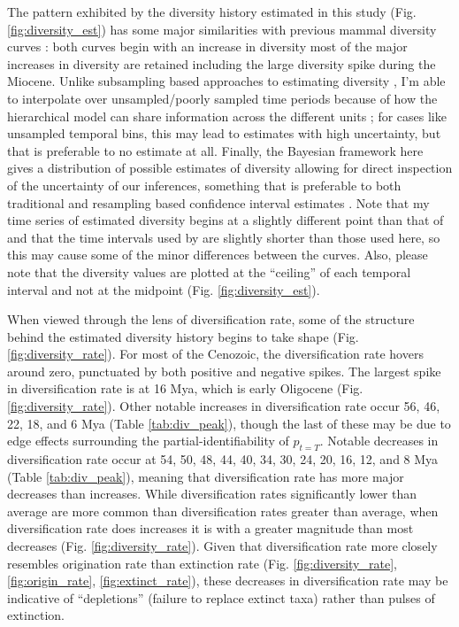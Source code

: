 \documentclass[12pt,letterpaper]{article}
\begin{document}
The pattern exhibited by the diversity history estimated in this study (Fig. \ref{fig:diversity_est}) has some major similarities with previous mammal diversity curves \citep{Alroy2009}: both curves begin with an increase in diversity most of the major increases in diversity are retained including the large diversity spike during the Miocene. Unlike subsampling based approaches to estimating diversity \citep{Alroy2010c}, I'm able to interpolate over unsampled/poorly sampled time periods because of how the hierarchical model can share information across the different units \cite{Gelman2013d}; for cases like unsampled temporal bins, this may lead to estimates with high uncertainty, but that is preferable to no estimate at all. Finally, the Bayesian framework here gives a distribution of possible estimates of diversity allowing for direct inspection of the uncertainty of our inferences, something that is preferable to both traditional and resampling based confidence interval estimates \citep{Gelman2013d}. Note that my time series of estimated diversity begins at a slightly different point than that of \citet{Alroy2009} and that the time intervals used by \citet{Alroy2009} are slightly shorter than those used here, so this may cause some of the minor differences between the curves. Also, please note that the diversity values are plotted at the ``ceiling'' of each temporal interval and not at the midpoint (Fig. \ref{fig:diversity_est}).

When viewed through the lens of diversification rate, some of the structure behind the estimated diversity history begins to take shape (Fig. \ref{fig:diversity_rate}). For most of the Cenozoic, the diversification rate hovers around zero, punctuated by both positive and negative spikes. The largest spike in diversification rate is at 16 Mya, which is early Oligocene (Fig. \ref{fig:diversity_rate}). Other notable increases in diversification rate occur 56, 46, 22, 18, and 6 Mya (Table \ref{tab:div_peak}), though the last of these may be due to edge effects surrounding the partial-identifiability of \(p_{t = T}\). Notable decreases in diversification rate occur at 54, 50, 48, 44, 40, 34, 30, 24, 20, 16, 12, and 8 Mya (Table \ref{tab:div_peak}), meaning that diversification rate has more major decreases than increases. While diversification rates significantly lower than average are more common than diversification rates greater than average, when diversification rate does increases it is with a greater magnitude than most decreases (Fig. \ref{fig:diversity_rate}). Given that diversification rate more closely resembles origination rate than extinction rate (Fig. \ref{fig:diversity_rate}, \ref{fig:origin_rate}, \ref{fig:extinct_rate}), these decreases in diversification rate may be indicative of ``depletions'' (failure to replace extinct taxa) rather than pulses of extinction. 
\end{document}
